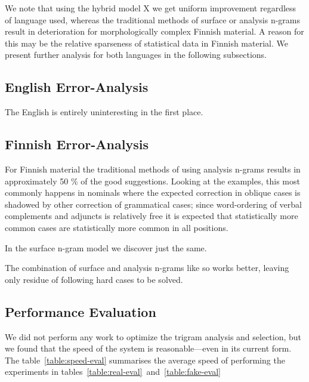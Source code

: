 \documentclass[11pt,a4paper]{article}
\begin{document}
We note that using the hybrid model X we get uniform improvement regardless
of language used, whereas the traditional methods of surface or analysis n-grams
result in deterioration for morphologically complex Finnish material. A reason
for this may be the relative sparseness of statistical data in Finnish
material. We present further analysis for both languages in the following 
subsections.

\subsection{English Error-Analysis}

The English is entirely uninteresting in the first place.

\subsection{Finnish Error-Analysis}

For Finnish material the traditional methods of using analysis n-grams results
in approximately 50 \% of the good suggestions. Looking at the examples, this
most commonly happens in nominals where the expected correction in oblique
cases is shadowed by other correction of grammatical cases; since word-ordering
of verbal complements and adjuncts is relatively free it is expected that
statistically more common cases are statistically more common in all positions.

In the surface n-gram model we discover just the same.

The combination of surface and analysis n-grams like so works better, leaving
only residue of following hard cases to be solved.

\subsection{Performance Evaluation}

We did not perform any work to optimize the trigram analysis and selection,
but we found that the speed of the system is reasonable---even in its current
form. The table~\ref{table:speed-eval} summarises the average
speed of performing the experiments in tables~\ref{table:real-eval}~and~\ref{table:fake-eval}
\end{document}
